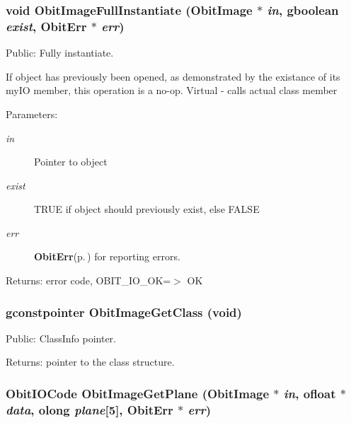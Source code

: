 \subsubsection{\setlength{\rightskip}{0pt plus 5cm}void Obit\-Image\-Full\-Instantiate ({\bf Obit\-Image} $\ast$ {\em in}, gboolean {\em exist}, {\bf Obit\-Err} $\ast$ {\em err})}\label{ObitImage_8c_a22}


Public: Fully instantiate. 

If object has previously been opened, as demonstrated by the existance of its my\-IO member, this operation is a no-op. Virtual - calls actual class member \begin{Desc}
\item[Parameters:]
\begin{description}
\item[{\em in}]Pointer to object \item[{\em exist}]TRUE if object should previously exist, else FALSE \item[{\em err}]{\bf Obit\-Err}{\rm (p.\,\pageref{structObitErr})} for reporting errors. \end{description}
\end{Desc}
\begin{Desc}
\item[Returns:]error code, OBIT\_\-IO\_\-OK=$>$ OK \end{Desc}
\subsubsection{\setlength{\rightskip}{0pt plus 5cm}gconstpointer Obit\-Image\-Get\-Class (void)}\label{ObitImage_8c_a12}


Public: Class\-Info pointer. 

\begin{Desc}
\item[Returns:]pointer to the class structure. \end{Desc}
\subsubsection{\setlength{\rightskip}{0pt plus 5cm}Obit\-IOCode Obit\-Image\-Get\-Plane ({\bf Obit\-Image} $\ast$ {\em in}, {\bf ofloat} $\ast$ {\em data}, {\bf olong} {\em plane}[5], {\bf Obit\-Err} $\ast$ {\em err})}\label{ObitImage_8c_a25}


